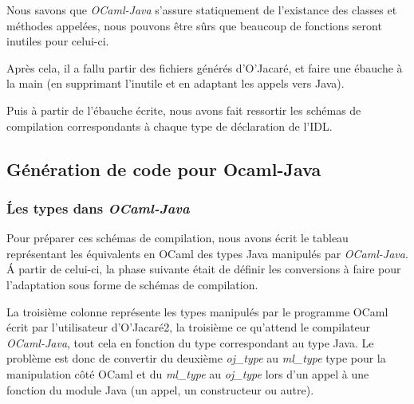 \documentclass[a4paper, 11pt]{article}
\begin{document}
Nous savons que \emph{OCaml-Java} s'assure statiquement de l'existance des classes et méthodes appelées, nous pouvons être sûrs que beaucoup de fonctions seront inutiles pour celui-ci.

Après cela, il a fallu partir des fichiers générés d'O'Jacaré, et faire une ébauche à la main (en supprimant l'inutile et en adaptant les appels vers Java).

Puis à partir de l'ébauche écrite, nous avons fait ressortir les schémas de compilation correspondants à chaque type de déclaration de l'IDL.





\subsection{Génération de code pour Ocaml-Java}

\subsubsection{\'Les types dans \emph{OCaml-Java}}
Pour préparer ces schémas de compilation, nous avons écrit le tableau représentant les équivalents en OCaml des types Java manipulés
par \emph{OCaml-Java}. \'A partir de celui-ci, la phase suivante était de définir les conversions à faire pour l'adaptation sous forme de schémas de compilation.

La troisième colonne représente les types manipulés par le programme
OCaml écrit par l'utilisateur d'O'Jacaré2, la troisième ce qu'attend le compilateur \emph{OCaml-Java}, tout cela en fonction du type correspondant au type Java.
Le problème est donc de convertir du deuxième \emph{oj\_type} au \emph{ml\_type} type pour la manipulation côté OCaml et du \emph{ml\_type} au \emph{oj\_type} lors d'un appel à une fonction du module Java (un appel, un constructeur ou autre).
\end{document}

